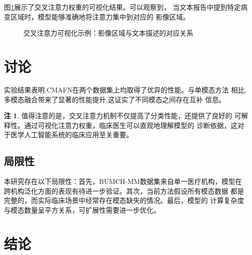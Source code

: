 \documentclass[12pt,a4paper]{article}
\theoremstyle{definition}
\newtheorem{remark}{注}[section]
\begin{document}
图\ref{fig:attention-vis}展示了交叉注意力权重的可视化结果。可以观察到，
当文本报告中提到特定病变区域时，模型能够准确地将注意力集中到对应的
影像区域。

\begin{figure}[H]
\centering
{}
\caption{交叉注意力可视化示例：影像区域与文本描述的对应关系}\label{fig:attention-vis}
\end{figure}


\section{讨论}

实验结果表明,CMAFN在两个数据集上均取得了优异的性能。与单模态方法
相比,多模态融合带来了显著的性能提升,这证实了不同模态之间存在互补
信息。

\begin{remark}
值得注意的是，交叉注意力机制不仅提高了分类性能，还提供了良好的
可解释性。通过可视化注意力权重，临床医生可以直观地理解模型的
诊断依据，这对于医学人工智能系统的临床应用至关重要。
\end{remark}

\subsection{局限性}

本研究存在以下局限性：首先，BUMCH-MM数据集来自单一医疗机构，模型在
跨机构泛化方面的表现有待进一步验证。其次，当前方法假设所有模态数据
都是完整的，而实际临床场景中经常存在模态缺失的情况。最后，模型的
计算复杂度与模态数量呈平方关系，可扩展性需要进一步优化。


\section{结论}
\end{document}
